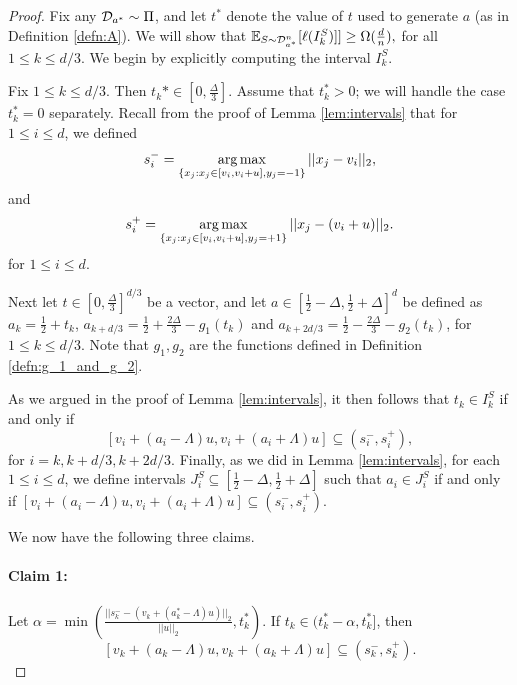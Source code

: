 \begin{proof}
Fix any ${\mathcal D}_{a^*} \sim \Pi$, and let $t^*$ denote the value of $t$ used to generate $a$ (as in Definition \ref{defn:A}). We will show that ${\mathbb E}_{S \sim {\mathcal D}_{a^*}^n}[\ell(I_k^S)]] \geq \Omega(\frac{d}{n}),$ for all $1 \leq k \leq d/3$. We begin by explicitly computing the interval $I_k^S$. 

Fix $1 \leq k \leq d/3$. Then $t_k* \in [0, \frac{\Delta}{3}]$. Assume that $t_k^* > 0$; we will handle the case $t_k^* = 0$ separately. Recall from the proof of Lemma \ref{lem:intervals} that for $1 \leq i \leq d$, we defined $$s_i^- = \operatorname*{arg\,max}_{\{x_j: x_j \in [v_i, v_i + u], y_j = -1\}} ||x_j - v_i||_2,$$ and $$s_i^+ = \operatorname*{arg\,max}_{\{x_j: x_j \in [v_i, v_i + u], y_j = +1\}} ||x_j - (v_i+ u)||_2.$$ for $1 \leq i \leq d$. 

Next let $t \in [0, \frac{\Delta}{3}]^{d/3}$ be a vector, and let $a \in [\frac{1}{2} - \Delta, \frac{1}{2} + \Delta]^d$ be defined as $a_k = \frac{1}{2} + t_k$, $a_{k + d/3} = \frac{1}{2} + \frac{2\Delta}{3} - g_1(t_k)$ and $a_{k + 2d/3} = \frac{1}{2} - \frac{2\Delta}{3} - g_2(t_k)$, for $1 \leq k \leq d/3$. Note that $g_1, g_2$ are the functions defined in Definition \ref{defn:g_1_and_g_2}.

As we argued in the proof of Lemma \ref{lem:intervals}, it then follows that $t_k \in I_k^S$ if and only if $$[v_i + (a_i - \Lambda)u, v_i + (a_i + \Lambda)u] \subseteq (s_i^-, s_i^+),$$ for $i = k, k+d/3, k+2d/3$. Finally, as we did in Lemma \ref{lem:intervals}, for each $1 \leq i \leq d$, we define intervals $J_i^S \subseteq [\frac{1}{2} - \Delta, \frac{1}{2} + \Delta]$ such that $a_i \in J_i^S$ if and only if $[v_i + (a_i - \Lambda)u, v_i + (a_i + \Lambda)u] \subseteq (s_i^-, s_i^+)$. 


We now have the following three claims.

\paragraph{Claim 1:} Let $\alpha = \min \left(\frac{||s_k^- -  (v_k + (a_k^* - \Lambda)u)||_2}{||u||_2}, t_k^*\right)$. If $t_k \in (t_k^* - \alpha, t_k^*]$, then $$[v_k + (a_k - \Lambda)u, v_k + (a_k + \Lambda)u] \subseteq (s_k^-, s_k^+).$$ 


\end{proof}
